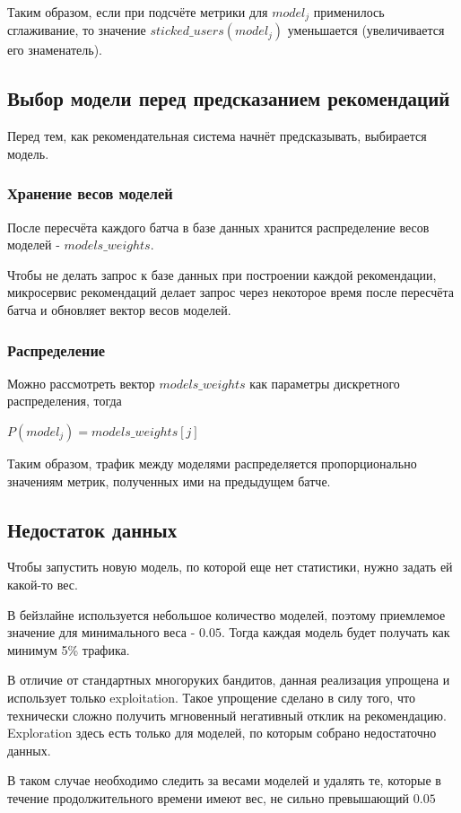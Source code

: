 \documentclass{article}
\begin{document}
\par
\vspace{3mm}

Таким образом, если при подсчёте метрики для $model_j$ применилось сглаживание, то значение $sticked\_users(model_j)$ уменьшается (увеличивается его знаменатель).

\subsection{Выбор модели перед предсказанием рекомендаций}

Перед тем, как рекомендательная система начнёт предсказывать, выбирается модель.

\subsubsection{Хранение весов моделей}

После пересчёта каждого батча в базе данных хранится распределение весов моделей - $models\_weights$. 
\par
Чтобы не делать запрос к базе данных при построении каждой рекомендации, микросервис рекомендаций делает запрос через некоторое время после пересчёта батча и обновляет вектор весов моделей.

\subsubsection{Распределение}

\par
Можно рассмотреть вектор $models\_weights$ как параметры дискретного распределения, тогда
\par
\vspace{3mm}

$P(model_j) = models\_weights[j]$

\par
\vspace{3mm}

Таким образом, трафик между моделями распределяется пропорционально значениям метрик, полученных ими на предыдущем батче.

\subsection{Недостаток данных}

Чтобы запустить новую модель, по которой еще нет статистики, нужно задать ей какой-то вес.
\par
В бейзлайне используется небольшое количество моделей, поэтому приемлемое значение для минимального веса - $0.05$. Тогда каждая модель будет получать как минимум 5\% трафика.
\par
В отличие от стандартных многоруких бандитов, данная реализация упрощена и использует только exploitation. Такое упрощение сделано в силу того, что технически сложно получить мгновенный негативный отклик на рекомендацию. Exploration здесь есть только для моделей, по которым собрано недостаточно данных.
\par
В таком случае необходимо следить за весами моделей и удалять те, которые в течение продолжительного времени имеют вес, не сильно превышающий $0.05$
\end{document}
